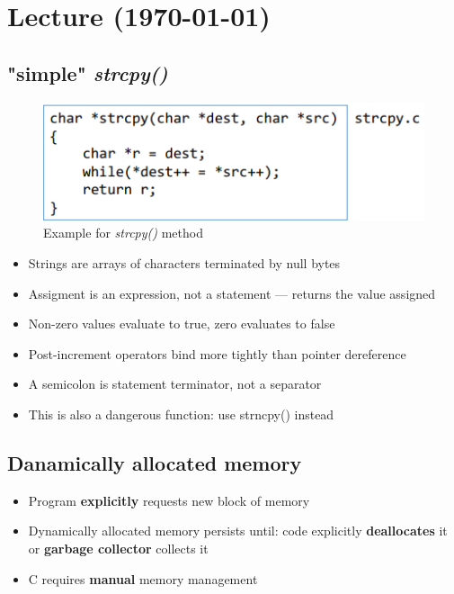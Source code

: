 \documentclass[a4paper,10pt]{article}
\begin{document}
\section{Lecture (\today)}
\subsection{"simple" \textit{strcpy()}}
\begin{figure}[H]
    \centering
    \includegraphics[width=0.75\linewidth]{Pictures/e21.png}
    \caption{Example for \textit{strcpy()} method}
    \label{fig:enter-label}
\end{figure}
\begin{itemize}
    \item Strings are arrays of characters terminated by null bytes
    \item Assigment is an expression, not a statement --- returns the value assigned
    \item Non-zero values evaluate to true, zero evaluates to false
    \item Post-increment operators bind more tightly than pointer dereference
    \item A semicolon is statement terminator, not a separator
    \item This is also a dangerous function: use strncpy() instead
\end{itemize}
\subsection{Danamically allocated memory}
\begin{itemize}
    \item Program \textbf{explicitly} requests new block of memory
    \item  Dynamically allocated memory persists until: code explicitly \textbf{deallocates} it or \textbf{garbage collector} collects it
    \item C requires \textbf{manual} memory management
\end{itemize}
\end{document}
